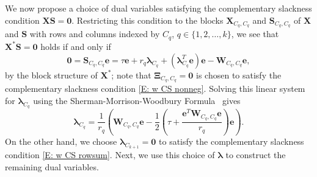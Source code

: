 \documentclass[twoside,11pt]{article}
\renewcommand{\S}{\mathbf{S}}
\newcommand{\E}{\mathbf{E}}
\newcommand{\e}{\bs {e}}
\newcommand{\bs}{\boldsymbol}
\newcommand{\X}{\bs {X}}
\newcommand{\W}{\bs {W}}
\newcommand{\0}{\bs{0}}
\newcommand{\sbra}[1] {\ensuremath{ \left[ #1\right]}} %
\newcommand{\rbra}[1]{\ensuremath{\left( #1 \right)}} %
\begin{document}
{%
We now propose a choice of dual variables satisfying the complementary slackness condition \(\X\S = \bs 0\).
Restricting this condition to the blocks \(\X_{C_q, C_q}\) and \(\S_{C_q, C_q}\) of \(\X\) and \(\S\) with
rows and columns indexed by \(C_q\), \(q \in\{1,2,\dots, k\}\), we see that \(\X^*\S=\bs 0\) holds if and only if
\[
\bs 0 = \S_{C_q, C_q} \e = %
\tau \e  + r_q \bs\lambda_{C_q} + (\bs\lambda_{C_q}^T \e) \e - \W_{C_q, C_q} \e,
\]
by the block structure of \(\X^*\);
note that \(\bs\Xi_{C_q, C_q} = \bs 0\) is chosen to satisfy the complementary slackness condition \eqref{E: w CS nonneg}.
Solving this linear system for \(\bs\lambda_{C_q}\)
using the Sherman-Morrison-Woodbury
Formula~\cite[Equation (2.1.4)]{golub2013matrix} gives
\begin{equation} \label{eq: lam q}
\bs \lambda_{C_q} = \frac{1}{r_q} \left( \W_{C_q, C_q} \e - \frac{1}{2}
\left(\tau + \frac{ \e^T \W_{C_q, C_q} \e}{r_q} \right)   \e \right).
\end{equation}
On the other hand, we choose \(\bs\lambda_{C_{k+1}} = \0\)
to satisfy the complementary slackness condition
\eqref{E: w CS rowsum}. %
Next, we use this choice of \(\bs \lambda\) to construct the remaining dual variables.

}
\end{document}
